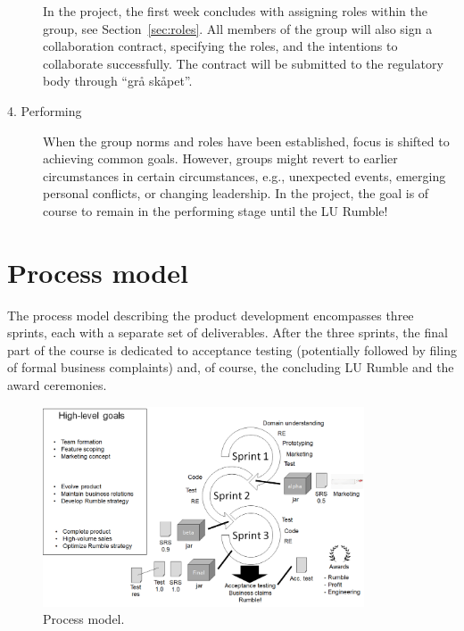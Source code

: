 \documentclass{scrreprt}
\begin{document}
\begin{description}
In the project, the first week concludes with assigning roles within the group, see Section~\ref{sec:roles}. All members of the group will also sign a collaboration contract, specifying the roles, and the intentions to collaborate successfully. The contract will be submitted to the regulatory body through ``grå skåpet''.
\item[4. Performing] When the group norms and roles have been established, focus is shifted to achieving common goals. However, groups might revert to earlier circumstances in certain circumstances, e.g., unexpected events, emerging personal conflicts, or changing leadership. In the project, the goal is of course to remain in the performing stage until the LU Rumble!
\end{description}

\section{Process model} \label{sec:process}
The process model describing the product development encompasses three sprints, each with a separate set of deliverables. 
After the three sprints, the final part of the course is dedicated to acceptance testing (potentially followed by filing of formal business complaints) and, of course, the concluding LU Rumble and the award ceremonies. 

\begin{figure}
\centering
\includegraphics[width=0.85\textwidth]{figures/processModel.png}
\caption{Process model.}
\label{fig:overview}
\end{figure}
\end{document}
